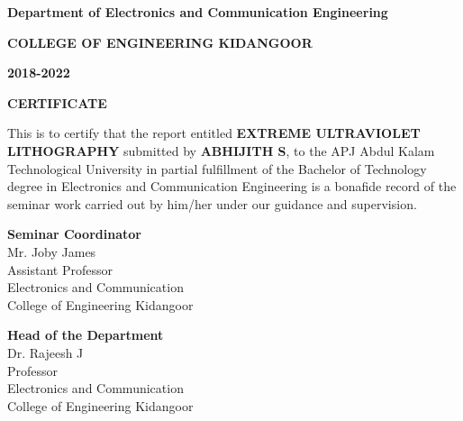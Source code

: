 \documentclass[12pt,a4paper]{report}
\begin{document}
\newpage
\begin{center}


\textbf{Department of Electronics and Communication Engineering}

\textbf{COLLEGE OF ENGINEERING KIDANGOOR}


\textbf{2018-2022}
\end{center}
\begin{center}

\end{center}
\vspace{0.2cm}
\begin{center}
 \textbf{CERTIFICATE}
\end{center}

This is to certify that the report entitled \textbf{ \large EXTREME ULTRAVIOLET LITHOGRAPHY} 
submitted by \textbf{ABHIJITH S}, to the APJ Abdul Kalam Technological University in 
partial fulfillment of the Bachelor of Technology degree in Electronics 
and Communication Engineering is a bonafide record of the seminar work 
carried out by him/her under our guidance and supervision.
\vspace{3cm}

\noindent \begin{minipage}{0.45\linewidth}
\begin{flushleft}
\vspace{3cm}
                         
\textbf{Seminar Coordinator} \\
\vspace{0.8cm}
Mr. Joby James \\
\footnotesize{Assistant Professor\\
Electronics and Communication\\
College of Engineering Kidangoor}\\

\end{flushleft} 
\end{minipage}
\hfill
\begin{minipage}{0.35\linewidth}
\begin{flushleft}                                      
\vspace{3cm}
                         
\textbf{Head of the Department} \\
\vspace{.8cm}
Dr. Rajeesh J\\
\footnotesize{Professor\\
Electronics and Communication\\
College of Engineering Kidangoor}\\


\end{flushleft} 
\end{minipage}
\thispagestyle{empty}
\end{document}
